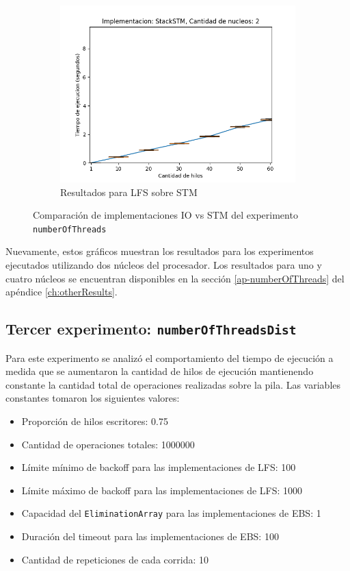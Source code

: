 \begin{figure}[H]
\begin{subfigure}[b]{0.49\textwidth}
        \includegraphics[width=\textwidth]{images/numberOfThreads/plots/expStackSTM-2}
        \caption{Resultados para LFS sobre STM}
        \label{subfig:numberOfThreads-stackstm-2}
    \end{subfigure}
    \caption{Comparación de implementaciones IO vs STM del experimento \texttt{numberOfThreads}}
    \label{fig:numberOfThreads-boxplots}
\end{figure}

Nuevamente, estos gráficos muestran los resultados para los experimentos ejecutados utilizando dos núcleos del procesador. Los resultados para uno y cuatro núcleos se encuentran disponibles en la sección \ref{ap-numberOfThreads} del apéndice \ref{ch:otherResults}.


\clearpage
\subsection{Tercer experimento: \texttt{numberOfThreadsDist}}
Para este experimento se analizó el comportamiento del tiempo de ejecución a medida que se aumentaron la cantidad de hilos de ejecución mantienendo constante la cantidad total de operaciones realizadas sobre la pila.
Las variables constantes tomaron los siguientes valores:

\begin{itemize}
    \item Proporción de hilos escritores: 0.75
    \item Cantidad de operaciones totales: 1000000
    \item Límite mínimo de backoff para las implementaciones de LFS: 100
    \item Límite máximo de backoff para las implementaciones de LFS: 1000
    \item Capacidad del \texttt{EliminationArray} para las implementaciones de EBS: 1
    \item Duración del timeout para las implementaciones de EBS: 100
    \item Cantidad de repeticiones de cada corrida: 10
\end{itemize}

